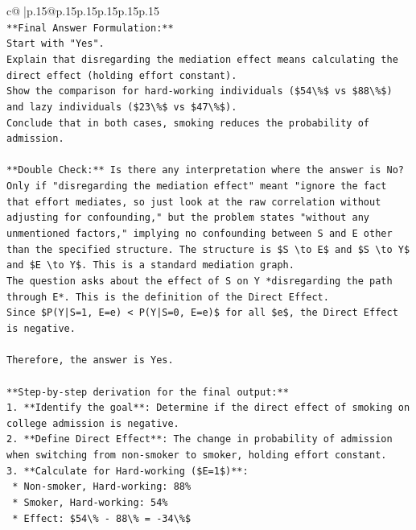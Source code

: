 \documentclass{article}
\begin{document}
{\begin{supertabular}{c@{$\;$}|p{.15\linewidth}@{}p{.15\linewidth}p{.15\linewidth}p{.15\linewidth}p{.15\linewidth}p{.15\linewidth}}
{{{\\ 
\texttt{**Final Answer Formulation:**} \\
\texttt{Start with "Yes".} \\
\texttt{Explain that disregarding the mediation effect means calculating the direct effect (holding effort constant).} \\
\texttt{Show the comparison for hard{-}working individuals (\$54\textbackslash{}\%\$ vs \$88\textbackslash{}\%\$) and lazy individuals (\$23\textbackslash{}\%\$ vs \$47\textbackslash{}\%\$).} \\
\texttt{Conclude that in both cases, smoking reduces the probability of admission.} \\
\\ 
\texttt{**Double Check:** Is there any interpretation where the answer is No?} \\
\texttt{Only if "disregarding the mediation effect" meant "ignore the fact that effort mediates, so just look at the raw correlation without adjusting for confounding," but the problem states "without any unmentioned factors," implying no confounding between S and E other than the specified structure. The structure is \$S \textbackslash{}to E\$ and \$S \textbackslash{}to Y\$ and \$E \textbackslash{}to Y\$. This is a standard mediation graph.} \\
\texttt{The question asks about the effect of S on Y *disregarding the path through E*. This is the definition of the Direct Effect.} \\
\texttt{Since \$P(Y|S=1, E=e) < P(Y|S=0, E=e)\$ for all \$e\$, the Direct Effect is negative.} \\
\\ 
\texttt{Therefore, the answer is Yes.} \\
\\ 
\texttt{**Step{-}by{-}step derivation for the final output:**} \\
\texttt{1.  **Identify the goal**: Determine if the direct effect of smoking on college admission is negative.} \\
\texttt{2.  **Define Direct Effect**: The change in probability of admission when switching from non{-}smoker to smoker, holding effort constant.} \\
\texttt{3.  **Calculate for Hard{-}working (\$E=1\$)**:} \\
\texttt{    *   Non{-}smoker, Hard{-}working: 88\%} \\
\texttt{    *   Smoker, Hard{-}working: 54\%} \\
\texttt{    *   Effect: \$54\textbackslash{}\% {-} 88\textbackslash{}\% = {-}34\textbackslash{}\%\$} \\
}}}
\end{supertabular}}
\end{document}
